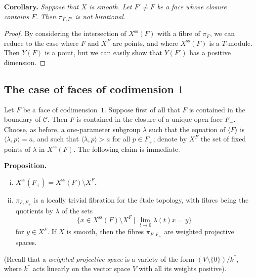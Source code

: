 \documentclass{article}
\newenvironment{itenv}[1]
  {\phantomsection\par\medskip\noindent\textbf{#1.}\itshape}
  {\medskip}
\renewcommand{\ss}{\mathrm{ss}}
\begin{document}
\begin{itenv}{Corollary}
  Suppose that $X$ is smooth.
  Let $F'\neq F$ be a face whose closure contains $F$.
  Then $\pi_{F,F'}$ is not birational.
\end{itenv}

\begin{proof}
  By considering the intersection of $X^\ss(F)$ with a fibre of $\pi_F$, we can reduce to the case where $F$ and $X^F$ are points, and where $X^\ss(F)$ is a $T$-module.
  Then $Y(F)$ is a point, but we can easily show that $Y(F')$ has a positive dimension.
\end{proof}


\subsection{The case of faces of codimension \texorpdfstring{$1$}{1}}
\label{1.5}

Let $F$ be a face of codimension~$1$.
Suppose first of all that $F$ is contained in the boundary of $\mathcal{C}$.
Then $F$ is contained in the closure of a unique open face $F_+$.
Choose, as before, a one-parameter subgroup $\lambda$ such that the equation of $\langle F\rangle$ is $\langle\lambda,p\rangle=a$, and such that $\langle\lambda,p\rangle>a$ for all $p\in F_+$;
denote by $X^F$ the set of fixed points of $\lambda$ in $X^\ss(F)$.
The following claim is immediate.

\begin{itenv}{Proposition}
  \begin{enumerate}[(i)]
    \item $X^\ss(F_+)=X^\ss(F)\setminus X^F$.
    \item $\pi_{F,F_+}$ is a locally trivial fibration for the \'{e}tale topology, with fibres being the quotients by $\lambda$ of the sets
      \[
        \big\{ x\in X^\ss(F)\setminus X^F \mid \lim_{t\to0}\lambda(t)x=y \big\}
      \]
      for $y\in X^F$.
      If $X$ is smooth, then the fibres $\pi_{F,F_+}$ are weighted projective spaces.
  \end{enumerate}
\end{itenv}

(Recall that a \emph{weighted projective space} is a variety of the form $(V\setminus\{0\})/k^*$, where $k^*$ acts linearly on the vector space $V$ with all its weights positive).
\end{document}

